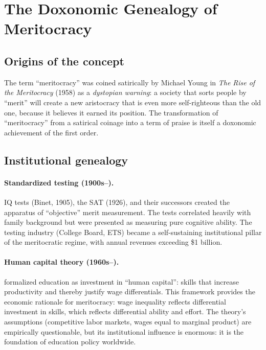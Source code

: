 \section{The Doxonomic Genealogy of Meritocracy}
\label{sec:ch22-genealogy}

\subsection{Origins of the concept}

The term ``meritocracy'' was coined satirically by Michael Young in \emph{The Rise of the Meritocracy} (1958) as a \emph{dystopian warning}: a society that sorts people by ``merit'' will create a new aristocracy that is even more self-righteous than the old one, because it believes it earned its position.
The transformation of ``meritocracy'' from a satirical coinage into a term of praise is itself a doxonomic achievement of the first order.

\subsection{Institutional genealogy}

\paragraph{Standardized testing (1900s--).}
IQ tests (Binet, 1905), the SAT (1926), and their successors created the apparatus of ``objective'' merit measurement.
The tests correlated heavily with family background but were presented as measuring pure cognitive ability.
The testing industry (College Board, ETS) became a self-sustaining institutional pillar of the meritocratic regime, with annual revenues exceeding \$1 billion.

\paragraph{Human capital theory (1960s--).}
\textcite{becker1964} formalized education as investment in ``human capital'': skills that increase productivity and thereby justify wage differentials.
This framework provides the economic rationale for meritocracy: wage inequality reflects differential investment in skills, which reflects differential ability and effort.
The theory's assumptions (competitive labor markets, wages equal to marginal product) are empirically questionable, but its institutional influence is enormous: it is the foundation of education policy worldwide.

